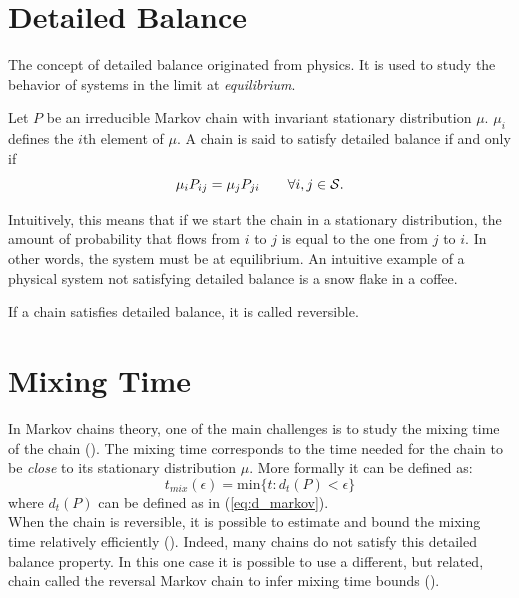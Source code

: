 \section{Detailed Balance}
The concept of detailed balance originated from physics. It is used to study the behavior of systems in the limit at \emph{equilibrium}. 
\begin{definition}
Let $P$ be an irreducible Markov chain with invariant stationary distribution $\mu$. $\mu_i$ defines the $i$th element of $\mu$. A chain is said to satisfy detailed balance if and only if
\begin{equation}
    \mu_i P_{ij} = \mu_j P_{ji} \qquad \forall i,j \in \mathcal{S}.
\end{equation}
\end{definition}
Intuitively, this means that if we start the chain in a stationary distribution, the amount of probability that flows from $i$ to $j$ is equal to the one from $j$ to $i$. In other words, the system must be at equilibrium. An intuitive example of a physical system not satisfying detailed balance is a snow flake in a coffee. 
\begin{remark}
If a chain satisfies detailed balance, it is called reversible.
\end{remark}

\section{Mixing Time}

In Markov chains theory, one of the main challenges is to study the mixing time of the chain (\citep{levin2017markov}). The mixing time corresponds to the time needed for the chain to be \emph{close} to its stationary distribution $\mu$. More formally it can be defined as:
\begin{equation}
    t_{mix}(\epsilon) = \text{min} \{ t : d_t(P) < \epsilon \}
\end{equation}
where $d_t(P)$ can be defined as in (\ref{eq:d_markov}).\\
When the chain is reversible, it is possible to estimate and bound the mixing time relatively efficiently (\citep{diaconis1991geometric,}). Indeed, many chains do not satisfy this detailed balance property. In this one case it is possible to use a different, but related, chain called the reversal Markov chain to infer mixing time bounds (\citep{fill1991eigenvalue,chung2012chernoff}).




